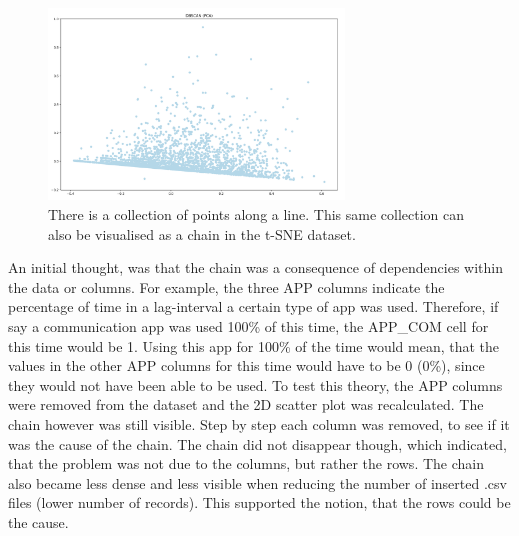 \begin{figure}[h]
  \centering
  \includegraphics[width=0.7\textwidth]{./images/pcaChain.png}
  \caption{There is a collection of points along a line. This same collection can also be visualised as a chain in the t-SNE dataset.}
  \label{figure:pcaChain}
\end{figure}

An initial thought, was that the chain was a consequence of dependencies within the data or columns. For example, the three APP columns indicate the percentage of time in a lag-interval a certain type of app was used. Therefore, if say a communication app was used 100\% of this time, the APP\_COM cell for this time would be 1. Using this app for 100\% of the time would mean, that the values in the other APP columns for this time would have to be 0 (0\%), since they would not have been able to be used. To test this theory, the APP columns were removed from the dataset and the 2D scatter plot was recalculated. The chain however was still visible. Step by step each column was removed, to see if it was the cause of the chain. The chain did not disappear though, which indicated, that the problem was not due to the columns, but rather the rows.  The chain also became less dense and less visible when reducing the number of inserted .csv files (lower number of records). This supported the notion, that the rows could be the cause.


